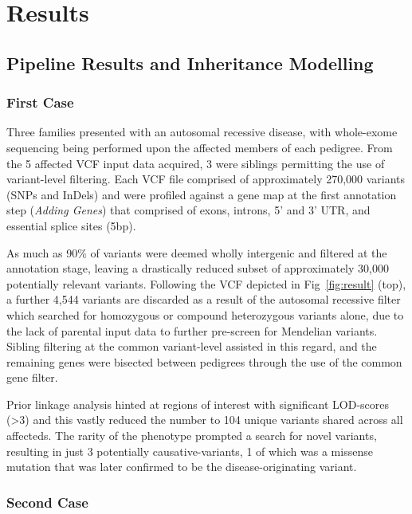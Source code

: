 \documentclass{bioinfo}
\begin{document}
\section{Results}

\subsection{Pipeline Results and Inheritance Modelling}

\subsubsection{First Case}

Three families presented with an autosomal recessive disease, with whole-exome sequencing being performed upon the affected members of each pedigree. From the 5 affected VCF input data acquired, 3 were siblings permitting the use of variant-level filtering. Each VCF file comprised of approximately 270,000 variants (SNPs and InDels) and were profiled against a gene map at the first annotation step (\textit{Adding Genes}) that comprised of exons, introns, 5' and 3' UTR, and essential splice sites (5bp).

As much as 90\% of variants were deemed wholly intergenic and filtered at the annotation stage, leaving a drastically reduced subset of approximately 30,000 potentially relevant variants. Following the VCF depicted in Fig~\ref{fig:result} (top), a further 4,544 variants are discarded as a result of the autosomal recessive filter which searched for homozygous or compound heterozygous variants alone, due to the lack of parental input data to further pre-screen for Mendelian variants. Sibling filtering at the common variant-level assisted in this regard, and the remaining genes were bisected between pedigrees through the use of the common gene filter.

Prior linkage analysis hinted at regions of interest with significant LOD-scores (>3) and this vastly reduced the number to 104 unique variants shared across all affecteds. The rarity of the phenotype prompted a search for novel variants, resulting in just 3 potentially causative-variants, 1 of which was a missense mutation that was later confirmed to be the disease-originating variant.


\subsubsection{Second Case}
\end{document}
